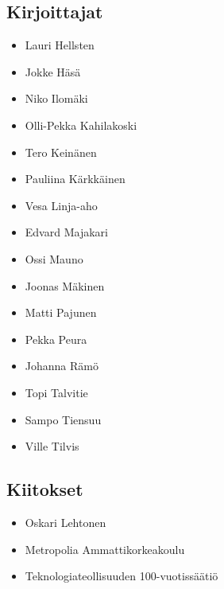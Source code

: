 \subsection*{Kirjoittajat}
\begin{itemize}
\item Lauri Hellsten
\item Jokke Häsä
\item Niko Ilomäki
\item Olli-Pekka Kahilakoski
\item Tero Keinänen
\item Pauliina Kärkkäinen
\item Vesa Linja-aho
\item Edvard Majakari
\item Ossi Mauno
\item Joonas Mäkinen
\item Matti Pajunen
\item Pekka Peura
\item Johanna Rämö
\item Topi Talvitie
\item Sampo Tiensuu
\item Ville Tilvis
\end{itemize}

\subsection*{Kiitokset}
\begin{itemize}
\item Oskari Lehtonen %
\item Metropolia Ammattikorkeakoulu %
\item Teknologiateollisuuden 100-vuotissäätiö %
\end{itemize}

